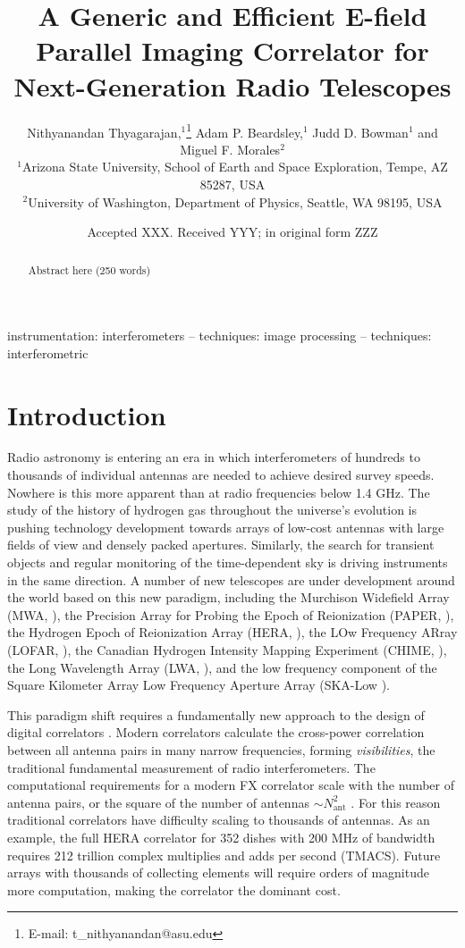 \documentclass[a4paper,fleqn,usenatbib]{../mnras}
\title[E-field Parallel Imaging Correlator]{A Generic and Efficient E-field Parallel Imaging Correlator for Next-Generation Radio Telescopes}
\author[Thyagarajan et al.]{
Nithyanandan Thyagarajan,$^{1}$\thanks{E-mail: t\_nithyanandan@asu.edu}
Adam P. Beardsley,$^{1}$
Judd D. Bowman$^{1}$
\newauthor
and Miguel F. Morales$^{2}$
\\
$^{1}$Arizona State University, School of Earth and Space Exploration, Tempe, AZ 85287, USA\\
$^{2}$University of Washington, Department of Physics, Seattle, WA 98195, USA\\
}
\date{Accepted XXX. Received YYY; in original form ZZZ}
\newcommand{\Nant}{N_{\text{ant}}}
\begin{document}
\label{firstpage}
\pagerange{\pageref{firstpage}--\pageref{lastpage}}
\maketitle

\begin{abstract}
Abstract here (250 words)
\end{abstract}

\begin{keywords}
instrumentation: interferometers -- techniques: image processing -- techniques: interferometric
\end{keywords}



\section{Introduction}

Radio astronomy is entering an era in which interferometers of hundreds to thousands of individual antennas are needed to achieve desired survey speeds. Nowhere is this more apparent than at radio frequencies below 1.4 GHz. The study of the history of hydrogen gas throughout the universe's evolution is pushing technology development towards arrays of low-cost antennas with large fields of view and densely packed apertures. Similarly, the search for transient objects and regular monitoring of the time-dependent sky is driving instruments in the same direction. A number of new telescopes are under development around the world based on this new paradigm, including the Murchison Widefield Array (MWA, \citealt{tin13}), the Precision Array for Probing the Epoch of Reionization (PAPER, \citealt{par10}), the Hydrogen Epoch of Reionization Array (HERA, \citealt{pob14}), the LOw Frequency ARray (LOFAR, \citealt{dev09}), the Canadian Hydrogen Intensity Mapping Experiment (CHIME, \citealt{ban14}), the Long Wavelength Array (LWA, \citealt{ell13}), and the low frequency component of the Square Kilometer Array Low Frequency Aperture Array (SKA-Low \citealt{mel13}).

This paradigm shift requires a fundamentally new approach to the design of digital correlators \citep{lon00}. Modern correlators calculate the cross-power correlation between all antenna pairs in many narrow frequencies, forming \emph{visibilities}, the traditional fundamental measurement of radio interferometers. The computational requirements for a modern FX correlator scale with the number of antenna pairs, or the square of the number of antennas $\sim \Nant^2$ \citep{bun04}. For this reason traditional correlators have difficulty scaling to thousands of antennas. As an example, the full HERA correlator for 352 dishes with 200 MHz of bandwidth requires 212 trillion complex multiplies and adds per second (TMACS). Future arrays with thousands of collecting elements will require orders of magnitude more computation, making the correlator the dominant cost.
\end{document}
